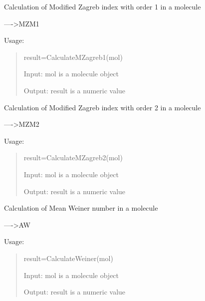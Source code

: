 \documentclass[letterpaper,10pt,english]{sphinxmanual}
\begin{document}
\begin{fulllineitems}
\label{reference/topology:topology.CalculateMZagreb1}
Calculation of Modified Zagreb index with order 1 in a molecule

----\textgreater{}MZM1

Usage:
\begin{quote}

result=CalculateMZagreb1(mol)

Input: mol is a molecule object

Output: result is a numeric value
\end{quote}

\end{fulllineitems}


\begin{fulllineitems}
\label{reference/topology:topology.CalculateMZagreb2}
Calculation of Modified Zagreb index with order 2 in a molecule

----\textgreater{}MZM2

Usage:
\begin{quote}

result=CalculateMZagreb2(mol)

Input: mol is a molecule object

Output: result is a numeric value
\end{quote}

\end{fulllineitems}


\begin{fulllineitems}
\label{reference/topology:topology.CalculateMeanWeiner}
Calculation of Mean Weiner number in a molecule

----\textgreater{}AW

Usage:
\begin{quote}

result=CalculateWeiner(mol)

Input: mol is a molecule object

Output: result is a numeric value
\end{quote}

\end{fulllineitems}
\end{document}

